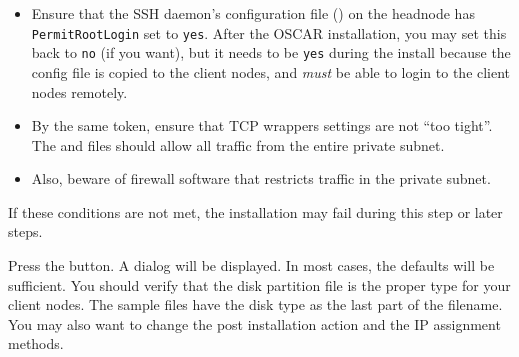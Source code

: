 \begin{itemize}

\item Ensure that the SSH daemon's configuration file
  () on the headnode has {\tt PermitRootLogin} 
  set to {\tt yes}.  After the OSCAR installation, you may set this back 
  to {\tt no} (if you want), but it needs to be {\tt yes} during the install 
  because the config file is copied to the client nodes, and  
  {\em must} be able to login to the client nodes remotely.

\item By the same token, ensure that TCP wrappers settings are not
  ``too tight''.  The  and  
  files should allow all traffic from the entire private subnet.
  
\item Also, beware of firewall software that restricts traffic in the
  private subnet.
\end{itemize}

If these conditions are not met, the installation may fail during this
step or later steps.

Press the  button. A dialog will be
displayed. In most cases, the defaults will be sufficient. You should
verify that the disk partition file is the proper type for your client
nodes. The sample files have the disk type as the last part of the
filename. You may also want to change the post installation action and
the IP assignment methods.  

